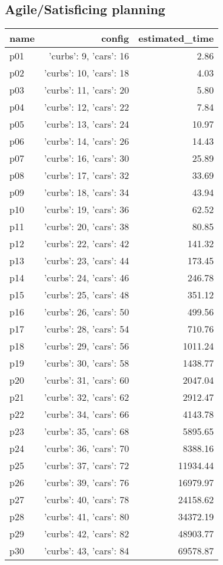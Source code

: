 \documentclass{article}
\begin{document}
                                \subsection*{Agile/Satisficing planning}
                                
                            \begin{center}
                            \scriptsize
                            \begin{tabular}{@{}l|r|r@{}}
                            name & config & estimated\_time\\\midrule
                              p01&{'curbs': 9, 'cars': 16}&2.86\\
  p02&{'curbs': 10, 'cars': 18}&4.03\\
  p03&{'curbs': 11, 'cars': 20}&5.80\\
  p04&{'curbs': 12, 'cars': 22}&7.84\\
  p05&{'curbs': 13, 'cars': 24}&10.97\\
  p06&{'curbs': 14, 'cars': 26}&14.43\\
  p07&{'curbs': 16, 'cars': 30}&25.89\\
  p08&{'curbs': 17, 'cars': 32}&33.69\\
  p09&{'curbs': 18, 'cars': 34}&43.94\\
  p10&{'curbs': 19, 'cars': 36}&62.52\\
  p11&{'curbs': 20, 'cars': 38}&80.85\\
  p12&{'curbs': 22, 'cars': 42}&141.32\\
  p13&{'curbs': 23, 'cars': 44}&173.45\\
  p14&{'curbs': 24, 'cars': 46}&246.78\\
  p15&{'curbs': 25, 'cars': 48}&351.12\\
  p16&{'curbs': 26, 'cars': 50}&499.56\\
  p17&{'curbs': 28, 'cars': 54}&710.76\\
  p18&{'curbs': 29, 'cars': 56}&1011.24\\
  p19&{'curbs': 30, 'cars': 58}&1438.77\\
  p20&{'curbs': 31, 'cars': 60}&2047.04\\
  p21&{'curbs': 32, 'cars': 62}&2912.47\\
  p22&{'curbs': 34, 'cars': 66}&4143.78\\
  p23&{'curbs': 35, 'cars': 68}&5895.65\\
  p24&{'curbs': 36, 'cars': 70}&8388.16\\
  p25&{'curbs': 37, 'cars': 72}&11934.44\\
  p26&{'curbs': 39, 'cars': 76}&16979.97\\
  p27&{'curbs': 40, 'cars': 78}&24158.62\\
  p28&{'curbs': 41, 'cars': 80}&34372.19\\
  p29&{'curbs': 42, 'cars': 82}&48903.77\\
  p30&{'curbs': 43, 'cars': 84}&69578.87
                            \end{tabular}
                            \end{center}
                    
\end{document}
